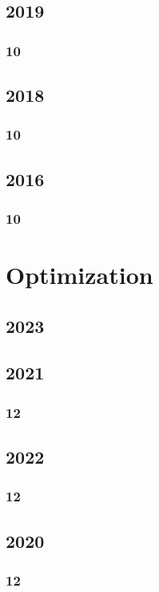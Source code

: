 \documentclass[11pt]{book}
\begin{document}
\section{2019} 
\subsection{10}

\section{2018} 
\subsection{10}

\section{2016}
\subsection{10}







\chapter{Optimization}
\section{2023}

\section{2021}
\subsection{12}

\section{2022}
\subsection{12}

\section{2020}
\subsection{12}

\end{document}
